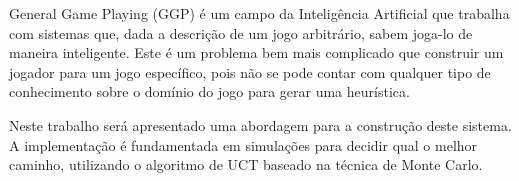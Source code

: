 General Game Playing (GGP) é um campo da Inteligência Artificial que trabalha com sistemas que, dada a descrição de um jogo arbitrário, sabem joga-lo de maneira inteligente. Este é um problema bem mais complicado que construir um jogador para um jogo específico, pois não se pode contar com qualquer tipo de conhecimento sobre o domínio do jogo para gerar uma heurística.

Neste trabalho será apresentado uma abordagem para a construção deste sistema. A implementação é fundamentada em simulações para decidir qual o melhor caminho, utilizando o algoritmo de UCT baseado na técnica de Monte Carlo.